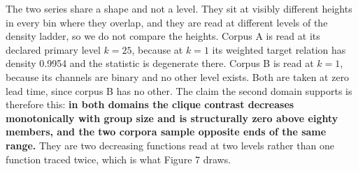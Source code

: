 \documentclass[twoside,11pt]{article}
\begin{document}
The two series share a shape and not a level. They sit at visibly different heights in every bin where they overlap, and they are read at different levels of the density ladder, so we do not compare the heights. Corpus A is read at its declared primary level \(k = 25\), because at \(k = 1\) its weighted target relation has density 0.9954 and the statistic is degenerate there. Corpus B is read at \(k = 1\), because its channels are binary and no other level exists. Both are taken at zero lead time, since corpus B has no other. The claim the second domain supports is therefore this: \textbf{in both domains the clique contrast decreases monotonically with group size and is structurally zero above eighty members, and the two corpora sample opposite ends of the same range.} They are two decreasing functions read at two levels rather than one function traced twice, which is what Figure 7 draws.
\end{document}
